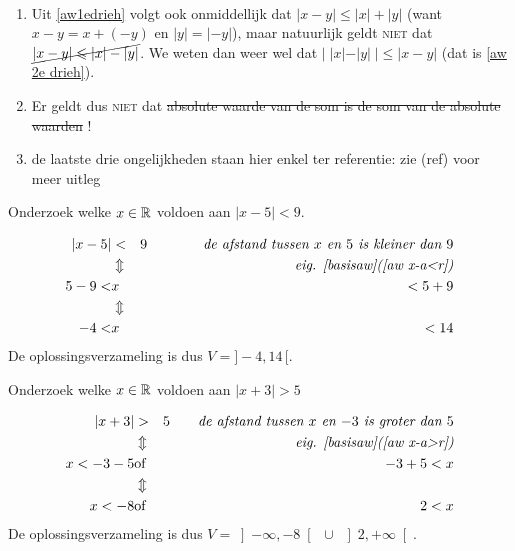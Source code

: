 \documentclass[numbers,wordchoicegiven]{ximera}
\begin{document}
\begin{remark}\ 
	\begin{enumerate}
		\item Uit \ref{aw1edrieh} volgt ook onmiddellijk dat $|x-y| \leq |x|+|y|$ (want $x-y=x+(-y)$ en $|y|=|-y|$), maar natuurlijk geldt \textsc{niet} dat $\cancel{|x-y| \leq |x| - |y|}$. We weten dan weer wel dat $|\;|x|-|y|\;|\leq|x-y|$ (dat is \ref{aw 2e drieh}).
		\item Er geldt dus \textsc{niet} dat \sout{absolute waarde van de som is de som van de absolute waarden} !
		\item de laatste drie ongelijkheden staan hier enkel ter referentie: zie (ref) voor meer uitleg
	\end{enumerate}
\end{remark}

\begin{problem} Onderzoek welke $x\in \R$ voldoen aan $|x-5|<9.$
		\begin{expandable}
		\begin{oplossing} 
			\begin{eqnarray*}
				|x-5|&<&9 \qquad\qquad \textit{de afstand tussen $x$ en $5$ is kleiner dan $9$}\\
				&\Updownarrow &\textit{eig. \ref{basisaw}(\ref{aw x-a<r})}\\
				5-9<&x&<5+9\\
				&\Updownarrow &\\
				-4<&x&<14
			\end{eqnarray*}
			De oplossingsverzameling is dus $V=]-4,14\,[.$
		\end{oplossing}
		\end{expandable}
	\end{problem}
\begin{problem}	Onderzoek welke $x\in \R$ voldoen aan $|x+3|>5$
		\begin{expandable}
		\begin{oplossing} 
			\begin{eqnarray*}
				|x+3|&>&5 \qquad \textit{de afstand tussen $x$ en $-3$ is groter dan $5$}\\
				&\Updownarrow &\textit{eig. \ref{basisaw}(\ref{aw x-a>r})}
				\\x<-3-5&\mbox{of}&-3+5<x\\
				&\Updownarrow &\\
				x<-8&\mbox{of}&2<x
			\end{eqnarray*}
			De oplossingsverzameling is dus $V=\left]-\infty,-8\right[
			\;\cup\;\left]2, +\infty\right[.$
		\end{oplossing}
		\end{expandable}

\end{problem}
\end{document}
